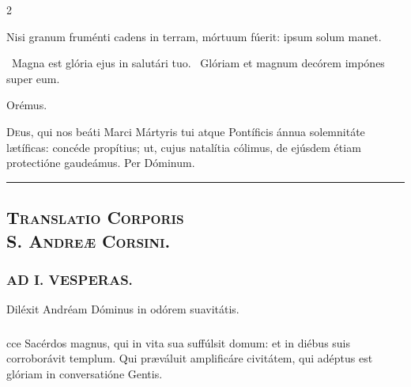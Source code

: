 \documentclass[9pt,twoside]{extarticle}
\begin{document}
\begin{multicols}{2}
\begin{tightlist}{}
\item {} Nisi granum fruménti cadens in terram, mórtuum fúerit: ipsum solum manet.
\item {}~Magna est glória ejus in salutári tuo. ~Glóriam et magnum decórem impónes super eum.
\item Orémus. \hfill {}
\end{tightlist}
\lettrine{D}eus, qui nos beáti Marci Mártyris tui atque Pontíficis ánnua solemnitáte lætíficas: concéde propítius; ut, cujus natalítia cólimus, de ejúsdem étiam protectióne gaudeámus. Per Dóminum.

\begin{center}\textcolor{red}{\rule{\linewidth}{0.5pt}} \end{center}

\subsection*{\center \textsc{}}
\subsection*{\center \textsc{Translatio Corporis\\ S. Andreæ Corsini.}}
\subsubsection*{\center {}}

\subsubsection*{\center \textsc{AD I. VESPERAS.}}
\begin{tightlist}{}
\item {} Diléxit Andréam Dóminus in odórem suavitátis.
\item {}
\end{tightlist}

\subsubsection*{}
cce Sacérdos magnus, qui in vita sua suffúlsit domum: et in diébus suis corroborávit templum. Qui præváluit amplificáre civitátem, qui adéptus est glóriam in conversatióne Gentis.


\end{multicols}
\end{document}
